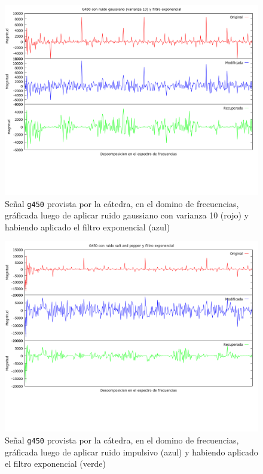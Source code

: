 \begin{figure}[H]
\begin {center}
\includegraphics[width=500pt]{imagenes/g450-gauss-10-exp.png}
\end {center}
\caption{Se\~nal \texttt{g450} provista por la c\'atedra, en el domino de frecuencias, gr\'aficada
luego de aplicar ruido gaussiano con varianza 10 (rojo) y 
habiendo aplicado el filtro exponencial (azul)}
\label{fig:GexpSpec}
\end{figure}

\begin{figure}[H]
\begin {center}
\includegraphics[width=500pt]{imagenes/g450-imp-exp.png}
\end {center}
\caption{Se\~nal \texttt{g450} provista por la c\'atedra, en el domino de frecuencias, gr\'aficada
luego de aplicar ruido impulsivo (azul) y habiendo aplicado el filtro exponencial (verde)}
\label{fig:SexpSig}
\end{figure}

